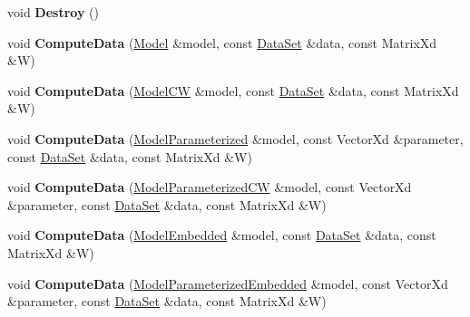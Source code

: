\begin{DoxyCompactItemize}
\item 
\hypertarget{struct_d_r_d_s_p_1_1_reduced_data_ae7d05055cf7f171a698dd8bb789cd14d}{void {\bfseries Destroy} ()}\label{struct_d_r_d_s_p_1_1_reduced_data_ae7d05055cf7f171a698dd8bb789cd14d}

\item 
\hypertarget{struct_d_r_d_s_p_1_1_reduced_data_a14c8be432ab0dcd6bf55e22611446440}{void {\bfseries Compute\-Data} (\hyperlink{struct_d_r_d_s_p_1_1_model}{Model} \&model, const \hyperlink{struct_d_r_d_s_p_1_1_data_set}{Data\-Set} \&data, const Matrix\-Xd \&W)}\label{struct_d_r_d_s_p_1_1_reduced_data_a14c8be432ab0dcd6bf55e22611446440}

\item 
\hypertarget{struct_d_r_d_s_p_1_1_reduced_data_a28ffe7941ba57202393ff840a540531f}{void {\bfseries Compute\-Data} (\hyperlink{struct_d_r_d_s_p_1_1_model_c_w}{Model\-C\-W} \&model, const \hyperlink{struct_d_r_d_s_p_1_1_data_set}{Data\-Set} \&data, const Matrix\-Xd \&W)}\label{struct_d_r_d_s_p_1_1_reduced_data_a28ffe7941ba57202393ff840a540531f}

\item 
\hypertarget{struct_d_r_d_s_p_1_1_reduced_data_a49482d08e81e41191b890138f5bfa66e}{void {\bfseries Compute\-Data} (\hyperlink{struct_d_r_d_s_p_1_1_model_parameterized}{Model\-Parameterized} \&model, const Vector\-Xd \&parameter, const \hyperlink{struct_d_r_d_s_p_1_1_data_set}{Data\-Set} \&data, const Matrix\-Xd \&W)}\label{struct_d_r_d_s_p_1_1_reduced_data_a49482d08e81e41191b890138f5bfa66e}

\item 
\hypertarget{struct_d_r_d_s_p_1_1_reduced_data_acea33e5759b6cd9ba56c1b67bb02fb2f}{void {\bfseries Compute\-Data} (\hyperlink{struct_d_r_d_s_p_1_1_model_parameterized_c_w}{Model\-Parameterized\-C\-W} \&model, const Vector\-Xd \&parameter, const \hyperlink{struct_d_r_d_s_p_1_1_data_set}{Data\-Set} \&data, const Matrix\-Xd \&W)}\label{struct_d_r_d_s_p_1_1_reduced_data_acea33e5759b6cd9ba56c1b67bb02fb2f}

\item 
\hypertarget{struct_d_r_d_s_p_1_1_reduced_data_a56bfd420c9dd4e7b9004ef0454fe7abd}{void {\bfseries Compute\-Data} (\hyperlink{struct_d_r_d_s_p_1_1_model_embedded}{Model\-Embedded} \&model, const \hyperlink{struct_d_r_d_s_p_1_1_data_set}{Data\-Set} \&data, const Matrix\-Xd \&W)}\label{struct_d_r_d_s_p_1_1_reduced_data_a56bfd420c9dd4e7b9004ef0454fe7abd}

\item 
\hypertarget{struct_d_r_d_s_p_1_1_reduced_data_a2eb42687ef6683254b9259ce25bfdc00}{void {\bfseries Compute\-Data} (\hyperlink{struct_d_r_d_s_p_1_1_model_parameterized_embedded}{Model\-Parameterized\-Embedded} \&model, const Vector\-Xd \&parameter, const \hyperlink{struct_d_r_d_s_p_1_1_data_set}{Data\-Set} \&data, const Matrix\-Xd \&W)}\label{struct_d_r_d_s_p_1_1_reduced_data_a2eb42687ef6683254b9259ce25bfdc00}


\end{DoxyCompactItemize}
